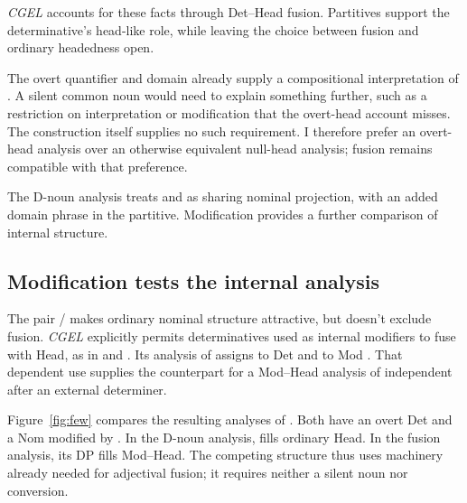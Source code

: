 \documentclass[12pt]{article}
\begin{document}
\textit{CGEL} accounts for these facts through Det--Head fusion. Partitives support the determinative's head-like role, while leaving the choice between fusion and ordinary headedness open.

The overt quantifier and domain already supply a compositional interpretation of . A silent common noun would need to explain something further, such as a restriction on interpretation or modification that the overt-head account misses. The construction itself supplies no such requirement. I therefore prefer an overt-head analysis over an otherwise equivalent null-head analysis; fusion remains compatible with that preference.

The D-noun analysis treats  and  as sharing nominal projection, with an added domain phrase in the partitive. Modification provides a further comparison of internal structure.

\subsection{Modification tests the internal analysis}

The pair / makes ordinary nominal structure attractive, but doesn't exclude fusion. \textit{CGEL} explicitly permits determinatives used as internal modifiers to fuse with Head, as in  and  \citep[415--416]{huddleston2002}. Its analysis of  assigns  to Det and  to Mod \citep[392]{huddleston2002}. That dependent use supplies the counterpart for a Mod--Head analysis of independent  after an external determiner.

Figure~\ref{fig:few} compares the resulting analyses of . Both have an overt Det and a Nom modified by . In the D-noun analysis,  fills ordinary Head. In the fusion analysis, its DP fills Mod--Head. The competing structure thus uses machinery already needed for adjectival fusion; it requires neither a silent noun nor conversion.
\end{document}

